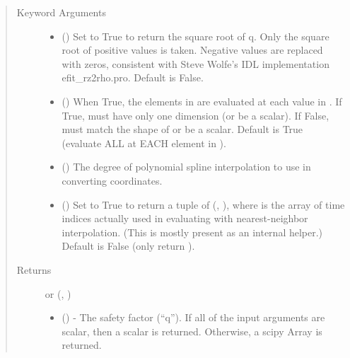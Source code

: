 \documentclass[letterpaper,10pt,english]{sphinxmanual}
\begin{document}
\begin{fulllineitems}
\begin{fulllineitems}
\begin{quote}
\begin{description}
\begin{itemize}
\end{itemize}

\item[{Keyword Arguments}] \leavevmode\begin{itemize}
\item {} 
 () \textendash{} Set to True to return the square root of q.
Only the square root of positive values is taken. Negative
values are replaced with zeros, consistent with Steve Wolfe’s
IDL implementation efit\_rz2rho.pro. Default is False.

\item {} 
 () \textendash{} When True, the elements in  are evaluated
at each value in . If True,  must have only one dimension
(or be a scalar). If False,  must match the shape of 
or be a scalar. Default is True (evaluate ALL  at EACH
element in ).

\item {} 
 () \textendash{} The degree of polynomial spline interpolation to
use in converting coordinates.

\item {} 
 () \textendash{} Set to True to return a tuple of (,
), where  is the array of time indices
actually used in evaluating  with nearest-neighbor
interpolation. (This is mostly present as an internal helper.)
Default is False (only return ).

\end{itemize}

\item[{Returns}] \leavevmode

 or (, )
\begin{itemize}
\item {} 
 () - The safety factor (“q”). If
all of the input arguments are scalar, then a scalar is returned.
Otherwise, a scipy Array is returned.


\end{itemize}
\end{description}
\end{quote}
\end{fulllineitems}
\end{fulllineitems}
\end{document}
